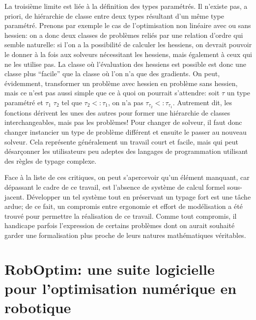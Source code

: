 La troisième limite est liée à la définition des types paramétrés. Il
n'existe pas, a priori, de hiérarchie de classe entre deux types
résultant d'un même type paramétré. Prenons par exemple le cas de
l'optimisation non linéaire avec ou sans hessien: on a donc deux
classes de problèmes reliés par une relation d'ordre qui semble
naturelle: si l'on a la possibilité de calculer les hessiens, on
devrait pouvoir le donner à la fois aux solveurs nécessitant les
hessiens, mais également à ceux qui ne les utilise pas. La classe où
l'évaluation des hessiens est possible est donc une classe plus
``facile'' que la classe où l'on n'a que des gradients. On peut,
évidemment, transformer un problème avec hessien en problème sans
hessien, mais ce n'est pas aussi simple que ce à quoi on pourrait
s'attendre: soit $\tau$ un type paramétré et $\tau_1$ $\tau_2$ tel que
$\tau_2 <: \tau_1$, on n'a pas $\tau_{\tau_2} <:
\tau_{\tau_1}$. Autrement dit, les fonctions dérivent les unes des
autres pour former une hiérarchie de classes interchangeables, mais
pas les problèmes! Pour changer de solveur, il faut donc changer
instancier un type de problème différent et ensuite le passer au
nouveau solveur. Cela représente généralement un travail court et
facile, mais qui peut désarçonner les utilisateurs peu adeptes des
langages de programmation utilisant des règles de typage complexe.


Face à la liste de ces critiques, on peut s'apercevoir qu'un élément
manquant, car dépassant le cadre de ce travail, est l'absence de
système de calcul formel sous-jacent. Développer un tel système tout
en préservant un typage fort est une tâche ardue; de ce fait, un
compromis entre ergonomie et effort de modélisation a été trouvé pour
permettre la réalisation de ce travail. Comme tout compromis, il
handicape parfois l'expression de certains problèmes dont on aurait
souhaité garder une formalisation plus proche de leurs natures
mathématiques véritables.


\section{RobOptim: une suite logicielle pour l'optimisation numérique en robotique}
\label{sec:chap1_roboptim}



